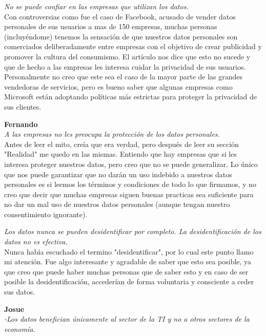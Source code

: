 \documentclass[12pt,a4paper]{article}
\begin{document}
\begin{enumerate}
\begin{enumerate}
				\textit {No se puede confiar en las empresas que utilizan los datos.}\\
				
        			Con controversias como fue el caso de Facebook, acusado de vender 
				datos personales de sus usuarios a mas de 150 empresas, muchas personas (incluyéndome) 
				tenemos la sensación de que nuestros datos personales son comerciados deliberadamente 
				entre empresas con el objetivo de crear publicidad y promover la cultura del consumismo. 
				El artículo nos dice que esto no sucede y que de hecho a las empresas les interesa cuidar 
				la privacidad de sus usuarios. Personalmente no creo que este sea el caso de la mayor 
				parte de las grandes vendedoras de servicios, pero es bueno saber que algunas empresas 
				como Microsoft están adoptando políticas más estrictas para proteger la privacidad de 
				sus clientes.
				
				\textbf{Fernando}\\
				\textit {A las empresas no les preocupa la protección de los datos personales.} \\

				Antes de leer el mito, creía que era verdad, pero después de leer su sección "Realidad" me quedo en las mismas.
				Entiendo que hay empresas que si les interesa proteger nuestros datos, pero creo que no se puede generalizar. Lo único que
				nos puede garantizar que no darán un uso indebido a nuestros datos personales es si leemos los términos y condiciones de
				todo lo que firmamos, y no creo que decir que muchas empresas siguen buenas practicas sea suficiente para no dar un mal 
				uso de nuestros datos personales (aunque tengan nuestro consentimiento ignorante).


				\textit {Los datos nunca se pueden desidentificar por completo. La desidentificación de los datos no es efectiva.} \\

				Nunca había escuchado el termino "desidentificar", por lo cual este punto llamo mi atención.
				Fue algo interesante y agradable de saber que esto sea posible, ya que creo que puede haber muchas personas que de saber 
				esto y en caso de ser posible la desidentificación, accederían de forma voluntaria y consciente a ceder sus datos.
				
				
				\textbf{Josue}\\
				\textit {-Los datos benefician únicamente al sector de
la TI y no a otros sectores de la economía.
} \\


\end{enumerate}
\end{enumerate}
\end{document}
